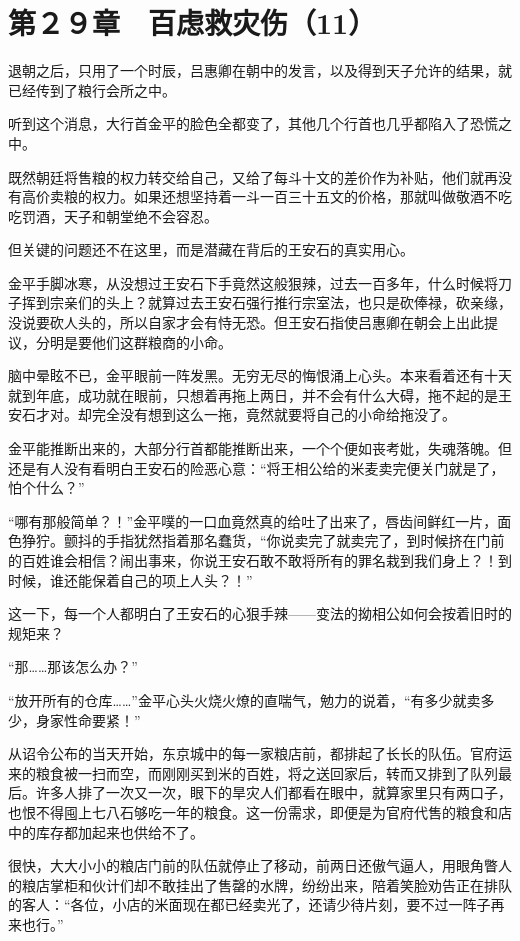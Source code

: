 \section{第２９章　百虑救灾伤（11）}

退朝之后，只用了一个时辰，吕惠卿在朝中的发言，以及得到天子允许的结果，就已经传到了粮行会所之中。

听到这个消息，大行首金平的脸色全都变了，其他几个行首也几乎都陷入了恐慌之中。

既然朝廷将售粮的权力转交给自己，又给了每斗十文的差价作为补贴，他们就再没有高价卖粮的权力。如果还想坚持着一斗一百三十五文的价格，那就叫做敬酒不吃吃罚酒，天子和朝堂绝不会容忍。

但关键的问题还不在这里，而是潜藏在背后的王安石的真实用心。

金平手脚冰寒，从没想过王安石下手竟然这般狠辣，过去一百多年，什么时候将刀子挥到宗亲们的头上？就算过去王安石强行推行宗室法，也只是砍俸禄，砍亲缘，没说要砍人头的，所以自家才会有恃无恐。但王安石指使吕惠卿在朝会上出此提议，分明是要他们这群粮商的小命。

脑中晕眩不已，金平眼前一阵发黑。无穷无尽的悔恨涌上心头。本来看着还有十天就到年底，成功就在眼前，只想着再拖上两日，并不会有什么大碍，拖不起的是王安石才对。却完全没有想到这么一拖，竟然就要将自己的小命给拖没了。

金平能推断出来的，大部分行首都能推断出来，一个个便如丧考妣，失魂落魄。但还是有人没有看明白王安石的险恶心意：“将王相公给的米麦卖完便关门就是了，怕个什么？”

“哪有那般简单？！”金平噗的一口血竟然真的给吐了出来了，唇齿间鲜红一片，面色狰狞。颤抖的手指犹然指着那名蠢货，“你说卖完了就卖完了，到时候挤在门前的百姓谁会相信？闹出事来，你说王安石敢不敢将所有的罪名栽到我们身上？！到时候，谁还能保着自己的项上人头？！”

这一下，每一个人都明白了王安石的心狠手辣——变法的拗相公如何会按着旧时的规矩来？

“那……那该怎么办？”

“放开所有的仓库……”金平心头火烧火燎的直喘气，勉力的说着，“有多少就卖多少，身家性命要紧！”

从诏令公布的当天开始，东京城中的每一家粮店前，都排起了长长的队伍。官府运来的粮食被一扫而空，而刚刚买到米的百姓，将之送回家后，转而又排到了队列最后。许多人排了一次又一次，眼下的旱灾人们都看在眼中，就算家里只有两口子，也恨不得囤上七八石够吃一年的粮食。这一份需求，即便是为官府代售的粮食和店中的库存都加起来也供给不了。

很快，大大小小的粮店门前的队伍就停止了移动，前两日还傲气逼人，用眼角瞥人的粮店掌柜和伙计们却不敢挂出了售罄的水牌，纷纷出来，陪着笑脸劝告正在排队的客人：“各位，小店的米面现在都已经卖光了，还请少待片刻，要不过一阵子再来也行。”


